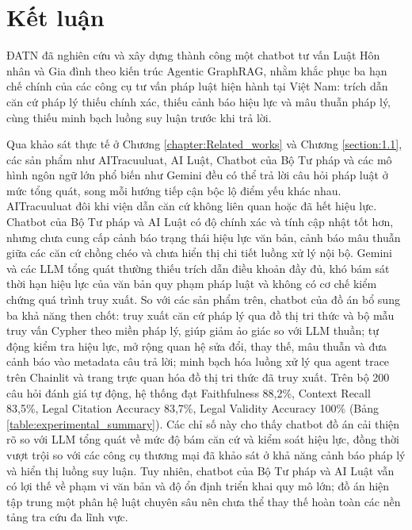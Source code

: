 \documentclass[../DoAn.tex]{subfiles}
\begin{document}
\section{Kết luận}

ĐATN đã nghiên cứu và xây dựng thành công một chatbot tư vấn Luật Hôn nhân và Gia đình theo kiến trúc Agentic GraphRAG, nhằm khắc phục ba hạn chế chính của các công cụ tư vấn pháp luật hiện hành tại Việt Nam: trích dẫn căn cứ pháp lý thiếu chính xác, thiếu cảnh báo hiệu lực và mâu thuẫn pháp lý, cùng thiếu minh bạch luồng suy luận trước khi trả lời.

Qua khảo sát thực tế ở Chương \ref{chapter:Related_works} và Chương \ref{section:1.1}, các sản phẩm như AITracuuluat, AI Luật, Chatbot của Bộ Tư pháp và các mô hình ngôn ngữ lớn phổ biến như Gemini đều có thể trả lời câu hỏi pháp luật ở mức tổng quát, song mỗi hướng tiếp cận bộc lộ điểm yếu khác nhau. AITracuuluat đôi khi viện dẫn căn cứ không liên quan hoặc đã hết hiệu lực. Chatbot của Bộ Tư pháp và AI Luật có độ chính xác và tính cập nhật tốt hơn, nhưng chưa cung cấp cảnh báo trạng thái hiệu lực văn bản, cảnh báo mâu thuẫn giữa các căn cứ chồng chéo và chưa hiển thị chi tiết luồng xử lý nội bộ. Gemini và các LLM tổng quát thường thiếu trích dẫn điều khoản đầy đủ, khó bám sát thời hạn hiệu lực của văn bản quy phạm pháp luật và không có cơ chế kiểm chứng quá trình truy xuất. So với các sản phẩm trên, chatbot của đồ án bổ sung ba khả năng then chốt: truy xuất căn cứ pháp lý qua đồ thị tri thức và bộ mẫu truy vấn Cypher theo miền pháp lý, giúp giảm ảo giác so với LLM thuần; tự động kiểm tra hiệu lực, mở rộng quan hệ sửa đổi, thay thế, mâu thuẫn và đưa cảnh báo vào metadata câu trả lời; minh bạch hóa luồng xử lý qua agent trace trên Chainlit và trang trực quan hóa đồ thị tri thức đã truy xuất. Trên bộ 200 câu hỏi đánh giá tự động, hệ thống đạt Faithfulness 88,2\%, Context Recall 83,5\%, Legal Citation Accuracy 83,7\%, Legal Validity Accuracy 100\% (Bảng \ref{table:experimental_summary}). Các chỉ số này cho thấy chatbot đồ án cải thiện rõ so với LLM tổng quát về mức độ bám căn cứ và kiểm soát hiệu lực, đồng thời vượt trội so với các công cụ thương mại đã khảo sát ở khả năng cảnh báo pháp lý và hiển thị luồng suy luận. Tuy nhiên, chatbot của Bộ Tư pháp và AI Luật vẫn có lợi thế về phạm vi văn bản và độ ổn định triển khai quy mô lớn; đồ án hiện tập trung một phân hệ luật chuyên sâu nên chưa thể thay thế hoàn toàn các nền tảng tra cứu đa lĩnh vực.
\end{document}
